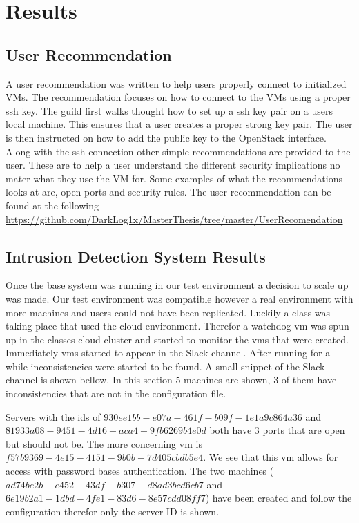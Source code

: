 \documentclass[12pt]{article}
\begin{document}
\section{Results}

\subsection{User Recommendation}
A user recommendation was written to help users properly connect to initialized VMs. The recommendation focuses on how to connect to the VMs using a proper ssh key. The guild first walks thought how to set up a ssh key pair on a users local machine. This ensures that a user creates a proper strong key pair. The user is then instructed on how to add the public key to the OpenStack interface. Along with the ssh connection other simple recommendations are provided to the user. These are to help a user understand the different security implications no mater what they use the VM for. Some examples of what the recommendations looks at are, open ports and security rules. The user recommendation can be found at the following \href{link}{https://github.com/DarkLog1x/MasterThesis/tree/master/UserRecomendation}

\subsection{Intrusion Detection System Results}
Once the base system was running in our test  environment a decision to scale up was made. Our test environment was compatible however a real environment with more machines and users could not have been replicated. Luckily a class was taking place that used the cloud environment. Therefor a watchdog vm was spun up in the classes cloud cluster and started to monitor the vms that were created. Immediately vms started to appear in the Slack channel. After running for a while inconsistencies were started to be found. A small snippet of the Slack channel is shown bellow. In this section 5 machines are shown, 3 of them have inconsistencies that are not in the configuration file.

Servers with the ids of $930ee1bb-e07a-461f-b09f-1e1a9c864a36$ and $81933a08-9451-4d16-aca4-9fb6269b4e0d$ both have 3 ports that are open but should not be. The more concerning vm is $f57b9369-4e15-4151-9b0b-7d405cbdb5e4$. We see that this vm allows for access with password bases authentication. The two machines ($ad74be2b-e452-43df-b307-d8ad3bcd6cb7$ and $6e19b2a1-1dbd-4fe1-83d6-8e57cdd08ff7$) have been created and follow the configuration therefor only the server ID is shown.
\end{document}
